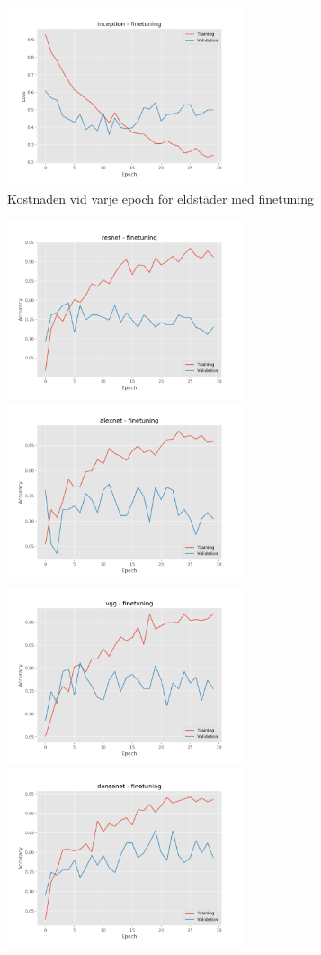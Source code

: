 \documentclass[]{kththesis}
\begin{document}
\begin{figure}[h]
    \includegraphics[width=7cm]{f_l_inception_fine}
    \caption{Kostnaden vid varje epoch för eldstäder med finetuning}
    \label{fig:f_l_2}
  \end{figure}

  \begin{figure}[h]
    \includegraphics[width=7cm]{f_a_resnet_fine}
    \includegraphics[width=7cm]{f_a_alexnet_fine}
    \includegraphics[width=7cm]{f_a_vgg_fine}
    \includegraphics[width=7cm]{f_a_densenet_fine}

\end{figure}
\end{document}
